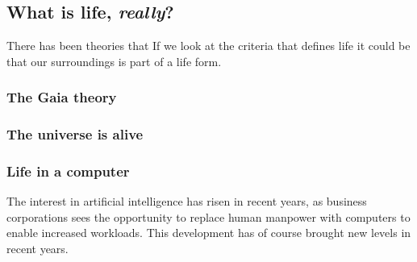 \subsection*{What is life, \textit{really}?}

There has been theories that 
If we look at the criteria that defines life it could be that our surroundings is part of a life form.

\subsubsection{The Gaia theory}

\subsubsection{The universe is alive}

\subsubsection{Life in a computer}
The interest in artificial intelligence has risen in recent years, as business corporations sees the opportunity to replace human manpower with computers to enable increased workloads.
This development has of course brought  new levels in recent years.